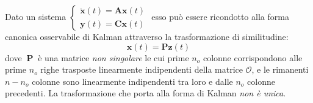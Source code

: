 \documentclass[a4paper]{article}
\renewcommand{\vec}{\bm}
\theoremstyle{definition}
\begin{document}
			\noindent
			Dato un sistema $ \begin{cases}
			\dot{\vec{x}}(t) = \vec{A}\vec{x}(t) \\
			\vec{y}(t) = \vec{C}\vec{x}(t)
			\end{cases} $ esso può essere ricondotto alla forma canonica osservabile di Kalman attraverso la trasformazione di similitudine:
			\[
			\vec{x}(t) = \vec{P}\vec{z}(t)
			\]
			dove $\ \vec{P}\ $ è una matrice \textit{non singolare} le cui prime $ n_o $ colonne corrispondono alle prime $ n_o $ righe trasposte linearmente indipendenti della matrice $ \mathcal{O} $, e le rimanenti $ n - n_o $ colonne sono linearmente indipendenti tra loro e dalle $ n_o $ colonne precedenti. La trasformazione che porta alla forma di Kalman \textit{non è unica}. 
\end{document}
